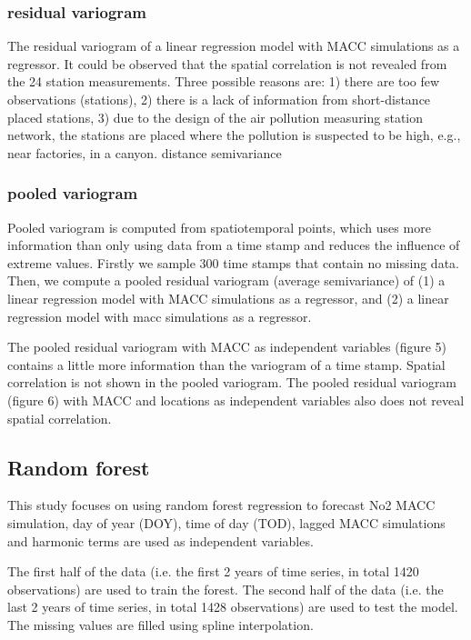 \documentclass{article}
\begin{document}
 
\subsubsection{residual variogram} 
The residual variogram of a linear regression model with MACC simulations as a regressor.
It could be observed that the spatial correlation is not revealed from the 24 station measurements. Three
possible reasons are: 1) there are too few observations (stations), 2) there is a lack of information from
short-distance placed stations, 3) due to the design of the air pollution measuring station network, the stations are placed where the pollution is suspected to be high, e.g., near factories, in a canyon.
distance semivariance
 
\subsubsection{pooled variogram}
Pooled variogram is computed from spatiotemporal points, which uses more information than only using data
from a time stamp and reduces the influence of extreme values.
Firstly we sample 300 time stamps that contain no missing data. Then, we compute a pooled residual variogram (average semivariance) of (1) a linear regression model with MACC simulations as a regressor, and (2) a linear regression model with macc simulations as a regressor.

The pooled residual variogram with MACC as independent variables (figure 5) contains a little more
information than the variogram of a time stamp. Spatial correlation is not shown in the pooled variogram.
The pooled residual variogram (figure 6) with MACC and locations as independent variables also does not
reveal spatial correlation.

\subsection{Random forest}
This study focuses on using random forest regression to forecast No2 MACC simulation, day of year (DOY), time of day (TOD), lagged MACC simulations and harmonic terms are used as independent variables.  

The first half of the data (i.e. the first 2 years of time series, in total 1420 observations) are used to train the forest. The second half of the data (i.e. the last 2 years of time series, in total 1428 observations) are used to test the model. The missing values are filled using spline interpolation. 
\end{document}
